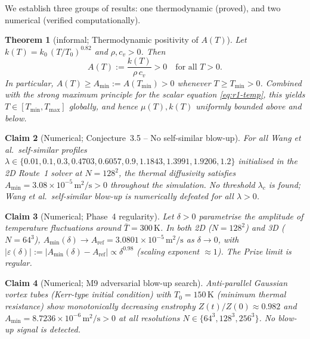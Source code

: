 \documentclass[12pt]{article}
\newtheorem{theorem}{Theorem}[section]
\newtheorem{claim}[theorem]{Claim}
\newcommand{\eps}{\varepsilon}
\newcommand{\Amin}{A_{\min}}
\begin{document}
We establish three groups of results: one thermodynamic (proved), and two
numerical (verified computationally).

\begin{theorem}[informal; Thermodynamic positivity of $A(T)$]
  \label{thm:AT-positive}
  Let $k(T) = k_0\,(T/T_0)^{0.82}$ and $\rho,c_v > 0$.  Then
  \[
    A(T) := \frac{k(T)}{\rho\,c_v} > 0
    \quad\text{for all } T > 0.
  \]
  In particular, $A(T) \geq A_{\min} := A(T_{\min}) > 0$ whenever
  $T \geq T_{\min} > 0$.  Combined with the strong maximum principle for the
  scalar equation \eqref{eq:r1-temp}, this yields $T \in [T_{\min}, T_{\max}]$
  globally, and hence $\mu(T), k(T)$ uniformly bounded above and below.
\end{theorem}

\begin{claim}[Numerical; Conjecture~3.5 -- No self-similar blow-up]
  \label{claim:conj35}
  For all Wang et al.\ self-similar profiles $\lambda \in \{0.01, 0.1, 0.3,
  0.4703, 0.6057, 0.9, 1.1843, 1.3991, 1.9206, 1.2\}$ initialised in the 2D
  Route~1 solver at $N = 128^2$, the thermal diffusivity satisfies
  $\Amin = 3.08\times 10^{-5}\,\mathrm{m}^2/\mathrm{s} > 0$ throughout
  the simulation.  No threshold $\lambda_c$ is found; Wang et al.\ self-similar
  blow-up is numerically defeated for all $\lambda > 0$.
\end{claim}

\begin{claim}[Numerical; Phase~4 regularity]
  \label{claim:phase4}
  Let $\delta > 0$ parametrise the amplitude of temperature fluctuations around
  $\bar{T} = 300\,\mathrm{K}$.  In both 2D ($N = 128^2$) and 3D ($N = 64^3$),
  $A_{\min}(\delta) \to A_{\mathrm{ref}} = 3.0801\times 10^{-5}\,\mathrm{m}^2/\mathrm{s}$
  as $\delta\to 0$, with $|\eps(\delta)| := |A_{\min}(\delta) - A_{\mathrm{ref}}|
  \propto \delta^{0.98}$ (scaling exponent $\approx 1$).  The Prize limit is
  \emph{regular}.
\end{claim}

\begin{claim}[Numerical; M9 adversarial blow-up search]
  \label{claim:m9}
  Anti-parallel Gaussian vortex tubes (Kerr-type initial condition) with
  $T_0 = 150\,\mathrm{K}$ (minimum thermal resistance) show monotonically
  \emph{decreasing} enstrophy $Z(t)/Z(0) \approx 0.982$ and
  $\Amin = 8.7236\times 10^{-6}\,\mathrm{m}^2/\mathrm{s} > 0$ at all
  resolutions $N \in \{64^3, 128^3, 256^3\}$.  No blow-up signal is detected.
\end{claim}
\end{document}
